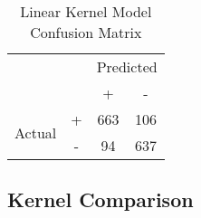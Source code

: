 \begin{table}[h!]
    \centering
    \begin{tabular}[h]{c c|c|c|}
        \cline{3-4}
        & & \multicolumn{2}{c|}{Predicted} \\
        \cline{3-4}
        & & + & - \\
        \hline
        \multicolumn{1}{|c|}{\multirow{2}{3em}{Actual}} & + & 663 & 106 \\
        \cline{2-4}
        \multicolumn{1}{|c|}{} & - & 94 & 637 \\
        \hline
    \end{tabular}
    \caption{\label{tab:lin_confusion}Linear Kernel Model Confusion Matrix}
\end{table}

\subsection{Kernel Comparison}

